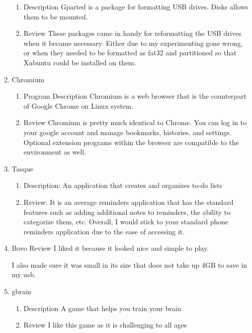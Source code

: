\documentclass{article}
\begin{document}
\begin{enumerate}
\label{sec:org92103cd}
\begin{enumerate}
\item Description
\label{sec:org730c2aa}
Gparted is a package for formatting USB drives. Disks allows them to be mounted.
\item Review
\label{sec:org6cc3707}
These packages came in handy for reformatting the USB drives when it became necessary. Either due to my experimenting gone wrong, or when they needed to be formatted as fat32 and partitioned so that Xubuntu could be installed on them.
\end{enumerate}
\item Chromium
\label{sec:org757c97a}
\begin{enumerate}
\item Program Description
\label{sec:org4b24dc4}
Chromium is a web browser that is the counterpart of Google Chrome on Linux system.
\item Review
\label{sec:org07307f4}
Chromium is pretty much identical to Chrome. You can log in to your google account and manage bookmarks, histories, and settings. Optional extension programs within the browser are compatible to the environment as well.
\end{enumerate}
\item Tasque
\label{sec:orgacc6fb4}
\begin{enumerate}
\item Description:
\label{sec:orgd1b647a}
An application that creates and organizes to-do lists 
\item Review:
\label{sec:org5bb69d6}
It is an average reminders application that has the standard features such as adding additional notes to reminders, the ability to categorize them, etc. Overall, I would stick to your standard phone reminders application due to the ease of accessing it.
\end{enumerate}
\item Bovo Review
\label{sec:orge3b24d6}
I liked it because it looked nice and simple to play. 

I also made sure it was small in its size that does not take up 4GB to save in my usb.
\item gbrain
\label{sec:orgafd93f5}
\begin{enumerate}
\item Description
\label{sec:org01eac15}
A game that helps you train your brain
\item Review
\label{sec:org839eb68}
I like this game as it is challenging to all ages
\end{enumerate}
\end{enumerate}
\end{document}

